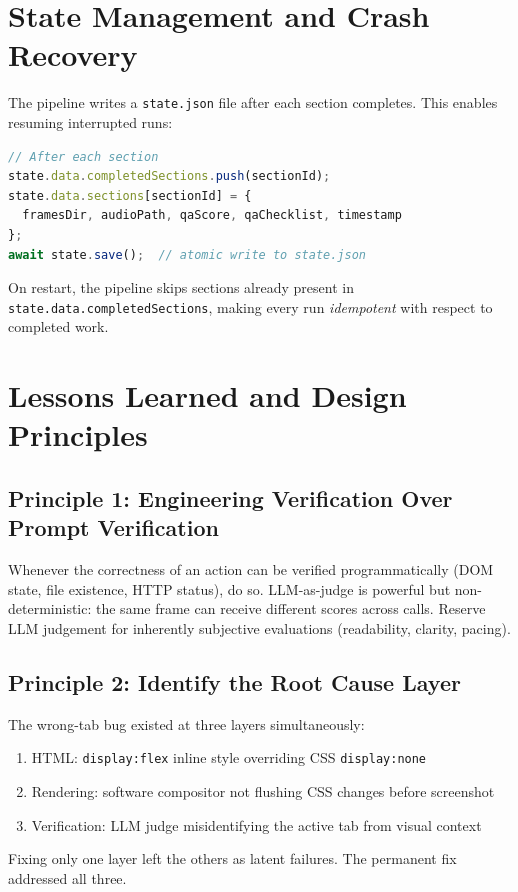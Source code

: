 \documentclass[12pt,a4paper]{article}
\begin{document}
\section{State Management and Crash Recovery}
\label{sec:state}

The pipeline writes a \texttt{state.json} file after each section completes.
This enables resuming interrupted runs:

\begin{lstlisting}[language=JavaScript, caption=State persistence pattern]
// After each section
state.data.completedSections.push(sectionId);
state.data.sections[sectionId] = {
  framesDir, audioPath, qaScore, qaChecklist, timestamp
};
await state.save();  // atomic write to state.json
\end{lstlisting}

On restart, the pipeline skips sections already present in
\texttt{state.data.completedSections}, making every run \emph{idempotent} with
respect to completed work.

\section{Lessons Learned and Design Principles}
\label{sec:lessons}

\subsection{Principle 1: Engineering Verification Over Prompt Verification}

Whenever the correctness of an action can be verified programmatically (DOM
state, file existence, HTTP status), do so. LLM-as-judge is powerful but
non-deterministic: the same frame can receive different scores across calls.
Reserve LLM judgement for inherently subjective evaluations (readability,
clarity, pacing).

\subsection{Principle 2: Identify the Root Cause Layer}

The wrong-tab bug existed at three layers simultaneously:
\begin{enumerate}[leftmargin=2em]
  \item HTML: \texttt{display:flex} inline style overriding CSS \texttt{display:none}
  \item Rendering: software compositor not flushing CSS changes before screenshot
  \item Verification: LLM judge misidentifying the active tab from visual context
\end{enumerate}
Fixing only one layer left the others as latent failures. The permanent fix
addressed all three.
\end{document}
